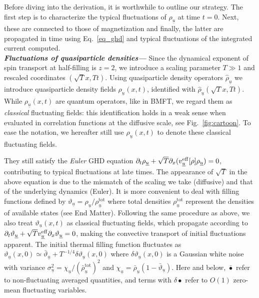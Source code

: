 \documentclass[
twocolumn,
amsfonts,
showpacs,
superscriptaddress,
amsmath,
amssymb,
aps,
longbibliography,
prl,
noeprint
]{revtex4-2}
\newcommand{\ch}[1]{{\color{black}  #1}}
\newcommand{\uu}{\underline{u}}
\newcommand{\Tx}{{x}}
\newcommand{\Tt}{{t}}
\newcommand{\veff}{v^\eff}
\newcommand{\para}[1]{ \noindent\emph{\textbf{#1---}}}
\newcounter{ls}
\newcommand{\p}{\partial}
\newcommand{\1}{{\bf 1}}
\newcommand{\eff}{{\rm eff}}
\begin{document}
Before diving into the derivation, it is worthwhile to outline our strategy. The first step is to characterize the typical fluctuations of $\rho_{\uu}$ at time $t=0$. Next, these are connected to those of magnetization and finally, the latter are propagated in time using Eq.~\eqref{eq_ghd} and typical fluctuations of the integrated current computed.\\
\para{Fluctuations of quasiparticle densities}
Since the dynamical exponent of spin transport at half-filling is $z=2$, we introduce a scaling parameter $T \gg 1$ and rescaled coordinates $(\sqrt{T}\Tx,T \Tt)$.
Using quasiparticle density operators $\hat{\rho}_{\underline{u}}$
\cite{Ilievski2017-2,BMFT,Yoshimura2025}
we introduce quasiparticle density fields $\rho_{\underline{u}}(x,t)$,  identified with $\hat{\rho}_{\underline{u}}(\sqrt{T}x,T t)$.
While $\rho_{\underline{u}}(x,t)$ are quantum operators, \ch{like in BMFT, we regard them}
as {\it classical} fluctuating fields: this identification holds in a weak sense when evaluated in correlation functions at the diffusive scale, see Fig.~\ref{fig:cartoon}. To ease the notation, we hereafter still use  $\rho_{\uu}(x,t)$ to denote these classical fluctuating fields.

They still satisfy the {\it Euler} GHD equation
$\p_t\rho_{\underline{u}}+\sqrt{T}\p_x(\veff_{\underline{u}}[\rho]\rho_{\underline{u}})=0$, contributing to typical fluctuations at late times. The appearance of $\sqrt{T}$ in the above equation is due to the mismatch of the scaling we take (diffusive) and that of the underlying dynamics (Euler).
It is more convenient to deal with filling functions defined by $\vartheta_{\uu}=\rho_{\uu}/\rho^\mathrm{tot}_{\uu}$ where total densities $\rho^\mathrm{tot}_{\uu}$ represent the densities of available states (see End Matter). Following the same procedure as above, we also treat $\vartheta_{\uu}(x,t)$ as classical fluctuating fields, which propagate according to $\partial_t\vartheta_{\uu}+\sqrt{T}v^\eff_{\uu}\partial_x\vartheta_{\uu}=0$, making the convective transport of initial fluctuations apparent.
The initial thermal filling function fluctuates as $\vartheta_{\underline{u}}(x,0)\simeq\bar{\vartheta}_{\underline{u}}+T^{-1/4}\delta\vartheta_{\underline{u}}(x,0)$ where $\delta\vartheta_{\underline{u}}(x,0)$ is a Gaussian white noise with variance $\sigma^2_{\underline{u}}=\chi_{\underline{u}}/(\bar{\rho}^\mathrm{tot}_{\underline{u}})^2$ and $\chi_{\underline{u}}=\bar{\rho}_{\uu}(1-\bar{\vartheta}_{\uu})$. Here and below, $\bar \bullet$ refer to non-fluctuating averaged quantities, and terms with $\delta \bullet$ refer to $O(1)$ zero-mean fluctuating variables.
\end{document}
